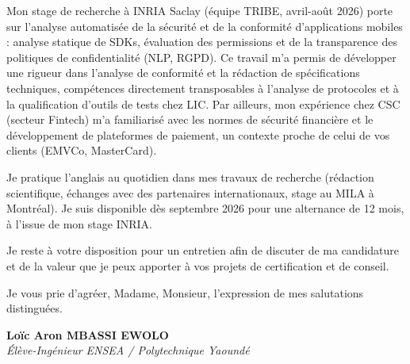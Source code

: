 \documentclass[a4paper,11pt]{article}
\begin{document}
Mon stage de recherche à INRIA Saclay (équipe TRIBE, avril-août 2026) porte sur l'analyse automatisée de la sécurité et de la conformité d'applications mobiles : analyse statique de SDKs, évaluation des permissions et de la transparence des politiques de confidentialité (NLP, RGPD). Ce travail m'a permis de développer une rigueur dans l'analyse de conformité et la rédaction de spécifications techniques, compétences directement transposables à l'analyse de protocoles et à la qualification d'outils de tests chez LIC. Par ailleurs, mon expérience chez CSC (secteur Fintech) m'a familiarisé avec les normes de sécurité financière et le développement de plateformes de paiement, un contexte proche de celui de vos clients (EMVCo, MasterCard).

Je pratique l'anglais au quotidien dans mes travaux de recherche (rédaction scientifique, échanges avec des partenaires internationaux, stage au MILA à Montréal). Je suis disponible dès septembre 2026 pour une alternance de 12 mois, à l'issue de mon stage INRIA.

Je reste à votre disposition pour un entretien afin de discuter de ma candidature et de la valeur que je peux apporter à vos projets de certification et de conseil.

Je vous prie d'agréer, Madame, Monsieur, l'expression de mes salutations distinguées.

\vspace{0.8cm}

\textbf{Loïc Aron MBASSI EWOLO}\\
\textit{Élève-Ingénieur ENSEA / Polytechnique Yaoundé}
\end{document}
